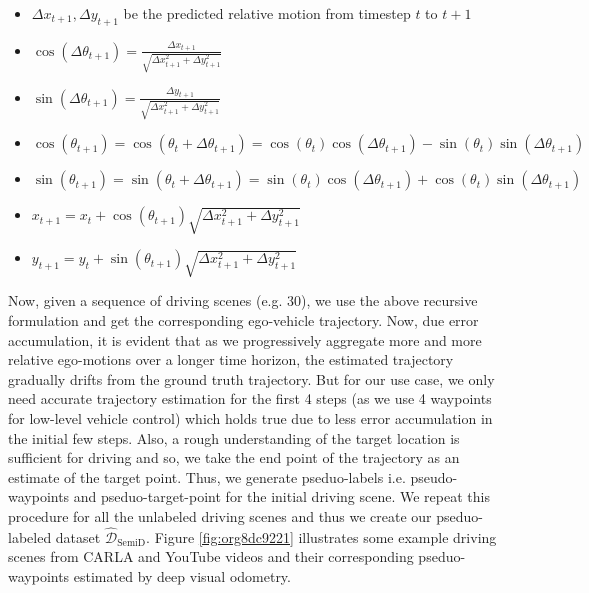 \documentclass[12pt, letterpaper,cleardoubleempty,BCOR1cm]{scrbook}
\begin{document}
\begin{itemize}
\item \(\Delta x_{t+1}, \Delta y_{t+1}\) be the predicted relative motion from timestep
\(t\) to \(t+1\)
\item \(\cos(\Delta\theta_{t+1}) = \frac{\Delta x_{t+1}}{\sqrt{\Delta x_{t+1}^{2}+\Delta y_{t+1}^{2}}}\)
\item \(\sin(\Delta\theta_{t+1}) = \frac{\Delta y_{t+1}}{\sqrt{\Delta x_{t+1}^{2}+\Delta y_{t+1}^{2}}}\)
\item \(\cos(\theta_{t+1}) = \cos(\theta_{t}+\Delta \theta_{t+1}) =
  \cos(\theta_{t})\cos(\Delta\theta_{t+1})-\sin(\theta_{t})\sin(\Delta\theta_{t+1})\)
\item \(\sin(\theta_{t+1}) = \sin(\theta_{t}+\Delta \theta_{t+1})=
  \sin(\theta_{t})\cos(\Delta\theta_{t+1})+\cos(\theta_{t})\sin(\Delta\theta_{t+1})\)
\item \(x_{t+1} = x_{t} + \cos(\theta_{t+1})\sqrt{\Delta x_{t+1}^{2}+\Delta y_{t+1}^{2}}\)
\item \(y_{t+1} = y_{t} + \sin(\theta_{t+1})\sqrt{\Delta x_{t+1}^{2}+\Delta y_{t+1}^{2}}\)
\end{itemize}

Now, given a sequence of driving scenes (e.g. 30), we use the above recursive
formulation and get the corresponding ego-vehicle trajectory. Now, due error
accumulation, it is evident that as we progressively aggregate more and more
relative ego-motions over a longer time horizon, the estimated trajectory
gradually drifts from the ground truth trajectory. But for our use case, we only
need accurate trajectory estimation for the first 4 steps (as we use 4 waypoints
for low-level vehicle control) which holds true due to less error accumulation
in the initial few steps. Also, a rough understanding of the target location is
sufficient for driving and so, we take the end point of the trajectory as an
estimate of the target point. Thus, we generate pseduo-labels
i.e. pseudo-waypoints and pseduo-target-point for the initial driving scene. We
repeat this procedure for all the unlabeled driving scenes and thus we create
our pseduo-labeled dataset \(\hat{\mathcal{D}}_{\text{SemiD}}\). Figure \ref{fig:org8dc9221}
illustrates some example driving scenes from CARLA and YouTube videos and their
corresponding pseduo-waypoints estimated by deep visual odometry.
\end{document}
